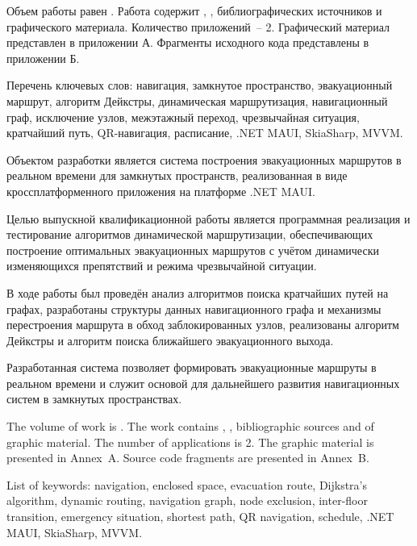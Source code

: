 
Объем работы равен . Работа содержит , ,  библиографических источников и  графического материала. Количество приложений~-- 2. Графический материал представлен в приложении А. Фрагменты исходного кода представлены в приложении Б.

Перечень ключевых слов: навигация, замкнутое пространство, эвакуационный маршрут, алгоритм Дейкстры, динамическая маршрутизация, навигационный граф, исключение узлов, межэтажный переход, чрезвычайная ситуация, кратчайший путь, QR-навигация, расписание, .NET MAUI, SkiaSharp, MVVM.

Объектом разработки является система построения эвакуационных маршрутов в реальном времени для замкнутых пространств, реализованная в виде кроссплатформенного приложения на платформе .NET MAUI.

Целью выпускной квалификационной работы является программная реализация и тестирование алгоритмов динамической маршрутизации, обеспечивающих построение оптимальных эвакуационных маршрутов с учётом динамически изменяющихся препятствий и режима чрезвычайной ситуации.

В ходе работы был проведён анализ алгоритмов поиска кратчайших путей на графах, разработаны структуры данных навигационного графа и механизмы перестроения маршрута в обход заблокированных узлов, реализованы алгоритм Дейкстры и алгоритм поиска ближайшего эвакуационного выхода.


Разработанная система позволяет формировать эвакуационные маршруты в реальном времени и служит основой для дальнейшего развития навигационных систем в замкнутых пространствах.


The volume of work is . The work contains , ,  bibliographic sources and  of graphic material. The number of applications is 2. The graphic material is presented in Annex~A. Source code fragments are presented in Annex~B.

List of keywords: navigation, enclosed space, evacuation route, Dijkstra’s algorithm, dynamic routing, navigation graph, node exclusion, inter-floor transition, emergency situation, shortest path, QR navigation, schedule, .NET MAUI, SkiaSharp, MVVM.

